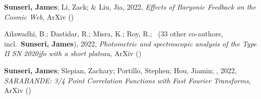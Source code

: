 \item \textbf{Sunseri, James}; Li, Zack; \& Liu, Jia, 2022, \emph{Effects of Baryonic Feedback on the Cosmic Web}, ArXiv ()

\item Ailawadhi, B.; Dastidar, R.; Misra, K.; Roy, R.; \etal\ ({33} other co-authors, incl.\ \textbf{Sunseri, James}), 2022, \emph{Photometric and spectroscopic analysis of the Type II SN 2020jfo with a short plateau}, ArXiv ()

\item \textbf{Sunseri, James}; Slepian, Zachary; Portillo, Stephen; Hou, Jiamin; \etal, 2022, \emph{SARABANDE: 3/4 Point Correlation Functions with Fast Fourier Transforms}, ArXiv ()